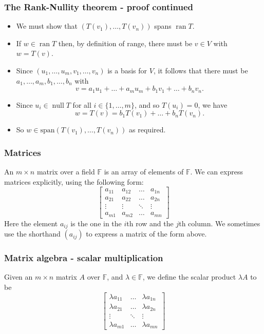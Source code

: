 \documentclass[handout]{beamer}
\newcommand{\bF}{\mathbb{F}}
\newcommand{\spa}{\mathrm{span}}
\DeclareMathOperator{\nul}{\mathrm{null}}
\DeclareMathOperator{\ran}{\mathrm{ran}}
\begin{document}
\begin{frame}
\frametitle{The Rank-Nullity theorem - proof continued}
\begin{itemize}
\item We must show that $(T(v_1),\ldots, T(v_n))$ spans $\ran T$. \vspace{0.2cm}
\item If $w\in \ran T$ then, by definition of range, there must be $v\in V$ with $w = T(v)$. \vspace{0.2cm}
\item Since $(u_1,\ldots,u_m,v_1,\ldots,v_n)$ is a basis for $V$, it follows that there must be $a_1,\ldots,a_m,b_1,\ldots,b_n$ with 
\[v = a_1u_1 + \ldots + a_mu_m+ b_1 v_1+\ldots + b_n v_n.\] 

\item Since $u_i\in \nul T$ for all $i\in\{1,\ldots,m\}$, and so $T(u_i)=0$, we have 
\[w = T(v) = b_1T(v_1)+\ldots + b_n T(v_n).\] 
\item So $w\in \spa(T(v_1),\ldots, T(v_n))$ as required. 
\end{itemize} 
\end{frame}

\begin{frame}
\frametitle{Matrices}
An $m\times n$ matrix over a field $\bF$ is an array of elements of $\bF$. We can express matrices explicitly, using the following form:
\[
\begin{bmatrix}
a_{11} & a_{12} & \dots & a_{1n}\\
a_{21} & a_{22} & \dots & a_{2n} \\
\vdots & \vdots & \ddots & \vdots \\
a_{m1} & a_{m2} & \dots & a_{mn}
\end{bmatrix}
\]
Here the element $a_{ij}$ is the one in the $i$th row and the $j$th column. We sometimes use the shorthand $(a_{ij})$ to express a matrix of the form above.
\end{frame}

\begin{frame}
\frametitle{Matrix algebra - scalar multiplication}
Given an $m\times n$ matrix $A$ over $\bF$, and $\lambda\in\bF$, we define the scalar product $\lambda A$ to be
\[
\begin{bmatrix}
\lambda a_{11}  & \dots & \lambda a_{1n} \\
\lambda a_{21}  &  \dots & \lambda a_{2n} \\
\vdots & \ddots & \vdots \\
\lambda a_{m1}  & \dots & \lambda a_{mn} 
\end{bmatrix}
\]
\end{frame}
\end{document}
